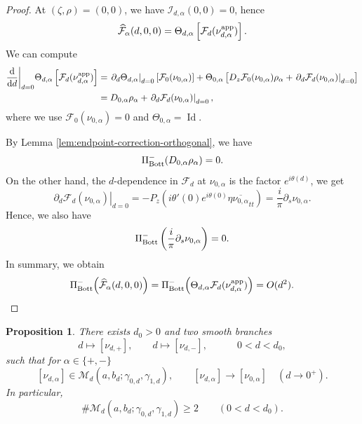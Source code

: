 \documentclass[11pt]{amsart}
\DeclareMathOperator{\Id}{Id}
\theoremstyle{plain}
\newtheorem{prop}[thm]{Proposition}
\theoremstyle{definition}
\newcommand{\dd}{\mathrm d}
\begin{document}
\begin{proof}
At $(\zeta,\rho)=(0,0)$, we have $\mathcal I_{d,\alpha}(0,0)=0$, hence
\[
\widehat{\mathcal F}_{\alpha}(d,0,0)
=\Theta_{d,\alpha}
\left[\mathcal F_d(\nu^{\rm app}_{d,\alpha})
\right].
\]    
We can compute
\begin{align*}
\frac{\dd}{\dd d}\bigg|_{d=0}\Theta_{d,\alpha}
\left[\mathcal F_d(\nu^{\rm app}_{d,\alpha})
\right]
&=\left.\partial_d\Theta_{d,\alpha}\right|_{d=0}
\left[\mathcal F_0(\nu_{0,\alpha})\right]
+\Theta_{0,\alpha}\left[
D_z\mathcal F_0(\nu_{0,\alpha})\rho_\alpha
+\left.\partial_d\mathcal F_d(\nu_{0,\alpha})
\right|_{d=0}\right]\\
&=D_{0,\alpha}\rho_\alpha
+\left.\partial_d\mathcal F_d(\nu_{0,\alpha})
\right|_{d=0},
\end{align*}
where we use $\mathcal F_0(\nu_{0,\alpha})=0$ and $\Theta_{0,\alpha}=\Id$.

By Lemma \ref{lem:endpoint-correction-orthogonal}, we have
\[\Pi_{\rm Bott}^-(D_{0,\alpha}\rho_\alpha)=0.\]
On the other hand, the $d$-dependence in $\mathcal F_d$ at $\nu_{0,\alpha}$ is the factor
$e^{i\theta(d)}$, we get
\[
\left.\partial_d\mathcal F_d(\nu_{0,\alpha})\right|_{d=0}
=-P_z\left(i\theta'(0)e^{i\theta(0)}
\eta\overline{\nu_{0,\alpha}}_{tt}\right)=
\frac{i}{\pi}\partial_s\nu_{0,\alpha}.
\]
Hence, we also have
\[\Pi_{\rm Bott}^-\left(\frac{i}{\pi}\partial_s\nu_{0,\alpha}\right)=0.\]
In summary, we obtain
\[
\Pi_{\rm Bott}^-\Bigl(\widehat{\mathcal F}_{\alpha}(d,0,0)\Bigr)=\Pi_{\rm Bott}^-\Bigl(\Theta_{d,\alpha}\mathcal F_d(\nu^{\rm app}_{d,\alpha})\Bigr)=
O(d^2).\qedhere\]
\end{proof}




\begin{prop}\label{prop:at-least-two-small-d}
There exists $d_0>0$ and two smooth branches
\[
d\longmapsto [\nu_{d,+}],
\qquad d\longmapsto [\nu_{d,-}],
\qquad \quad 0<d<d_0,
\]
such that for $\alpha\in \{+,-\}$
\[
[\nu_{d,\alpha}]\in \mathcal{M}_d(a,b_d;\gamma_{0,d},\gamma_{1,d}),
\qquad
[\nu_{d,\alpha}]\to [\nu_{0,\alpha}]
\quad (d\to 0^+).
\]
In particular,
\[
\#\mathcal{M}_d(a,b_d;\gamma_{0,d},\gamma_{1,d})\ge 2\qquad (0<d<d_0).
\]
\end{prop}
\end{document}
